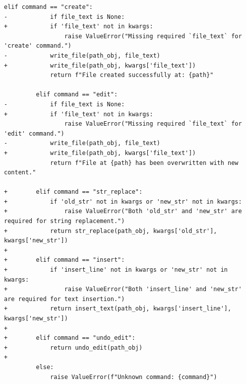 \documentclass{article}
\begin{document}
\begin{lstlisting}[style=diffstyle]
         elif command == "create":
-            if file_text is None:
+            if 'file_text' not in kwargs:
                 raise ValueError("Missing required `file_text` for 'create' command.")
-            write_file(path_obj, file_text)
+            write_file(path_obj, kwargs['file_text'])
             return f"File created successfully at: {path}"
 
         elif command == "edit":
-            if file_text is None:
+            if 'file_text' not in kwargs:
                 raise ValueError("Missing required `file_text` for 'edit' command.")
-            write_file(path_obj, file_text)
+            write_file(path_obj, kwargs['file_text'])
             return f"File at {path} has been overwritten with new content."
 
+        elif command == "str_replace":
+            if 'old_str' not in kwargs or 'new_str' not in kwargs:
+                raise ValueError("Both 'old_str' and 'new_str' are required for string replacement.")
+            return str_replace(path_obj, kwargs['old_str'], kwargs['new_str'])
+
+        elif command == "insert":
+            if 'insert_line' not in kwargs or 'new_str' not in kwargs:
+                raise ValueError("Both 'insert_line' and 'new_str' are required for text insertion.")
+            return insert_text(path_obj, kwargs['insert_line'], kwargs['new_str'])
+
+        elif command == "undo_edit":
+            return undo_edit(path_obj)
+
         else:
             raise ValueError(f"Unknown command: {command}")
\end{lstlisting}
\end{document}
